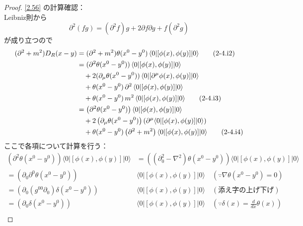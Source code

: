 \documentclass[a4paper,12pt]{article}
\begin{document}
\color{blue}
\begin{proof}
\eqref{2.56} の計算確認：\\
Leibniz則から
\begin{equation*}
  \partial^2 (fg) = (\partial^2 f)g + 2\partial f \partial g + f(\partial^2 g) \tag{2-4.i1}
\end{equation*}
が成り立つので
\begin{align*}
  (\partial^2 + m^2) D_R(x - y) &= (\partial^2 + m^2) \theta(x^0 - y^0)\, \langle 0 | [\phi(x), \phi(y)] | 0 \rangle \tag{2-4.i2}\\
  &= (\partial^2 \theta(x^0 - y^0))\, \langle 0 | [\phi(x), \phi(y)] | 0 \rangle \\
  &\quad + 2(\partial_\mu \theta(x^0 - y^0))\, \langle 0 | [\partial^\mu \phi(x), \phi(y)] | 0 \rangle\\
  &\quad + \theta(x^0 - y^0)\,\partial^2\, \langle 0 | [\phi(x), \phi(y)] | 0 \rangle\\
  &\quad + \theta(x^0 - y^0)\, m^2\, \langle 0 | [\phi(x), \phi(y)] | 0 \rangle \tag{2-4.i3}\\
  &= \left( \partial^2 \theta(x^0 - y^0) \right) \langle 0 | [\phi(x), \phi(y)] | 0 \rangle \notag \\
  &\quad + 2 \left( \partial_\mu \theta(x^0 - y^0) \right) \left( \partial^\mu \langle 0 | [\phi(x), \phi(y)] | 0 \rangle \right) \notag \\
  &\quad + \theta(x^0 - y^0) \left( \partial^2 + m^2 \right) \langle 0 | [\phi(x), \phi(y)] | 0 \rangle \tag{2-4.i4}
\end{align*}
ここで各項について計算を行う：
\begin{align*}
  \left( \partial^2 \theta(x^0 - y^0) \right) \langle 0 | [\phi(x), \phi(y)] | 0 \rangle &= \left( (\partial_0^2 - \nabla^2) \theta(x^0 - y^0) \right) \langle 0 | [\phi(x), \phi(y)] | 0 \rangle \tag{2-4.i5}\\
  = \left( \partial_0 \partial^0 \theta(x^0 - y^0) \right)& \langle 0 | [\phi(x), \phi(y)] | 0 \rangle\quad(\because \nabla \theta(x^0 - y^0) = 0) \tag{2-4.i6}\\
  = \left( \partial_0 (g^{00} \partial_0) \delta(x^0 - y^0) \right) &\langle 0 | [\phi(x), \phi(y)] | 0 \rangle \quad(\text{添え字の上げ下げ}) \tag{2-4.i7}\\
  = \left( \partial_0 \delta(x^0 - y^0) \right) &\langle 0 | [\phi(x), \phi(y)] | 0 \rangle \quad\left(\because \delta (x) = \frac{d}{dx} \theta(x)\right) \tag{2-4.i8}
\end{align*}
\begin{align*}

\end{align*}
\end{proof}
\end{document}
